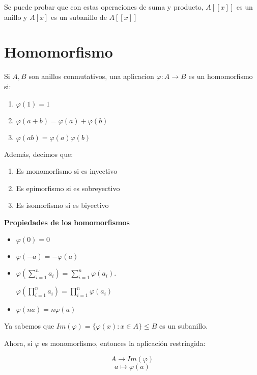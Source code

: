 \documentclass[11pt]{article}
\begin{document}
Se puede probar que con estas operaciones de suma y producto, $A[[x]]$ es un anillo y $A[x]$ es un subanillo de $A[[x]]$  

\section{Homomorfismo}

Si $A,B$ son anillos conmutativos, una aplicacion $\varphi: A \to B$ es un homomorfismo si:

\begin{enumerate}
	\item $\varphi(1) = 1$
	\item $\varphi(a+b) = \varphi(a) + \varphi(b)$
	\item $\varphi(ab) = \varphi(a)  \varphi(b)$
	
\end{enumerate}

Además, decimos que:

\begin{enumerate}
	\item Es monomorfismo si es inyectivo
	\item Es epimorfismo si es sobreyectivo
	\item Es isomorfismo si es biyectivo
\end{enumerate}

\textbf{Propiedades de los homomorfismos}

\begin{itemize}

\item $\varphi(0) = 0$

\item $\varphi(-a) = -\varphi(a) $

\item $\varphi(\sum_{i = 1}^n a_i) = \sum_{i = 1}^n\varphi(a_i)$. 

$\varphi(\prod_{i = 1}^n a_i) = \prod_{i = 1}^n\varphi(a_i)$

\item $\varphi(na) = n\varphi(a)$

	
\end{itemize}


Ya sabemos que $Im(\varphi) = \{ \varphi(x): x \in A\} \leq B$ es un subanillo.

Ahora, si $\varphi$ es monomorfismo, entonces la aplicación restringida:

\[
A \to Im(\varphi)\]
\[
a \mapsto \varphi(a)
\]
\end{document}
